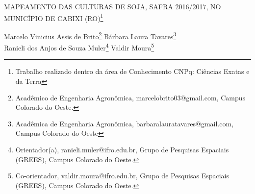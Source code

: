 \documentclass[article,12pt,onesidea,4paper,english,brazil]{abntex2}
\begin{document}
	
	
	\frenchspacing 
	
	\begin{center}
		\LARGE MAPEAMENTO DAS CULTURAS DE SOJA, SAFRA 2016/2017, NO MUNICÍPIO
		DE CABIXI (RO)\footnote{Trabalho realizado dentro da área de Conhecimento CNPq: Ciências Exatas e da Terra}
		
		\normalsize
		Marcelo Vinicius Assis de Brito\footnote{Acadêmico de Engenharia Agronômica, marcelobrito03@gmail.com, Campus Colorado do Oeste.} 
		Bárbara Laura Tavares\footnote{Acadêmica de Engenharia Agronômica, barbaralauratavares@gmail.com, Campus Colorado do
			Oeste} \\
		Ranieli dos Anjos de Souza Muler\footnote{Orientador(a), ranieli.muler@ifro.edu.br, Grupo de Pesquisas Espaciais (GREES), Campus Colorado
			do Oeste.} 
		Valdir
		Moura\footnote{Co-orientador, valdir.moura@ifro.edu.br, Grupo de Pesquisas Espaciais (GREES), Campus
			Colorado do Oeste.} 
	\end{center}
	
\end{document}
